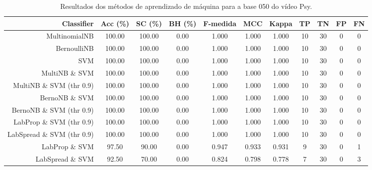 \begin{table}[!htb]
\centering
\caption{Resultados dos métodos de aprendizado de máquina para a base 050 do vídeo Psy.}
\label{tab:Psy-050}
\begin{tabular}{r|c|c|c|c|c|c|c|c|c|c}
\hline\hline
Classifier & Acc (\%) & SC (\%) & BH (\%) & F-medida & MCC & Kappa & TP & TN & FP & FN \\ \hline
MultinomialNB & 100.00 & 100.00 & 0.00 & 1.000 & 1.000 & 1.000 & 10 & 30 & 0 & 0 \\ 
BernoulliNB & 100.00 & 100.00 & 0.00 & 1.000 & 1.000 & 1.000 & 10 & 30 & 0 & 0 \\ 
SVM & 100.00 & 100.00 & 0.00 & 1.000 & 1.000 & 1.000 & 10 & 30 & 0 & 0 \\ 
MultiNB \& SVM & 100.00 & 100.00 & 0.00 & 1.000 & 1.000 & 1.000 & 10 & 30 & 0 & 0 \\ 
MultiNB \& SVM (thr 0.9) & 100.00 & 100.00 & 0.00 & 1.000 & 1.000 & 1.000 & 10 & 30 & 0 & 0 \\ 
BernoNB \& SVM & 100.00 & 100.00 & 0.00 & 1.000 & 1.000 & 1.000 & 10 & 30 & 0 & 0 \\ 
BernoNB \& SVM (thr 0.9) & 100.00 & 100.00 & 0.00 & 1.000 & 1.000 & 1.000 & 10 & 30 & 0 & 0 \\ 
LabProp \& SVM (thr 0.9) & 100.00 & 100.00 & 0.00 & 1.000 & 1.000 & 1.000 & 10 & 30 & 0 & 0 \\ 
LabSpread \& SVM (thr 0.9) & 100.00 & 100.00 & 0.00 & 1.000 & 1.000 & 1.000 & 10 & 30 & 0 & 0 \\ 
LabProp \& SVM & 97.50 & 90.00 & 0.00 & 0.947 & 0.933 & 0.931 & 9 & 30 & 0 & 1 \\ 
LabSpread \& SVM & 92.50 & 70.00 & 0.00 & 0.824 & 0.798 & 0.778 & 7 & 30 & 0 & 3 \\ 
\hline\hline
\end{tabular}
\end{table}
